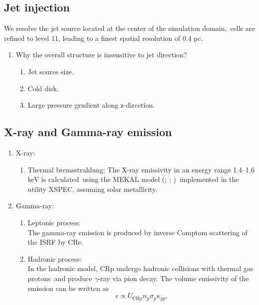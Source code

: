 \documentclass[twocolumn]{aastex631}
\begin{document}
\subsection{Jet injection}
  We resolve the jet source located at the center of the simulation domain,\
  cells are refined to level 11, leading to a finest spatial resolution of 0.4 pc.\

 \begin{enumerate}
    \item Why the overall structure is insensitive to jet direction?
      \begin{enumerate}
        \item Jet source size.
        \item Cold disk.
        \item Large pressure gradient along z-dircetion.
      \end{enumerate}
 \end{enumerate}



\subsection{X-ray and Gamma-ray emission}


  \begin{enumerate}
    \item X-ray:
       \begin{enumerate}
         \item Thermal bremsstrahlung: The X-ray emissivity in an energy range 1.4–1.6 keV is calculated\
               using the MEKAL model (\citealt{Xray-1}; \citealt{Xray-2}; \citealt{Xray-3})\
               implemented in the utility XSPEC\citep{XSPEC}, assuming solar metallicity.
       \end{enumerate}
    \item Gamma-ray:
       \begin{enumerate}
         \item Leptonic process:\\
          The gamma-ray emission is produced by inverse Comptom scattering of the ISRF by CRe.
         \item Hadronic process:\\
          In the hadronic model, CRp undergo hadronic collisions with thermal gas protons\
          and produce $\gamma$-ray via pion decay. The volume emissivity of the emission can be written as
          \begin{equation}
             \epsilon \propto U_{\text{CRp}}n_{p}\sigma_{p}\kappa_{pp}.
          \end{equation}
       \end{enumerate}
  \end{enumerate}
\end{document}

